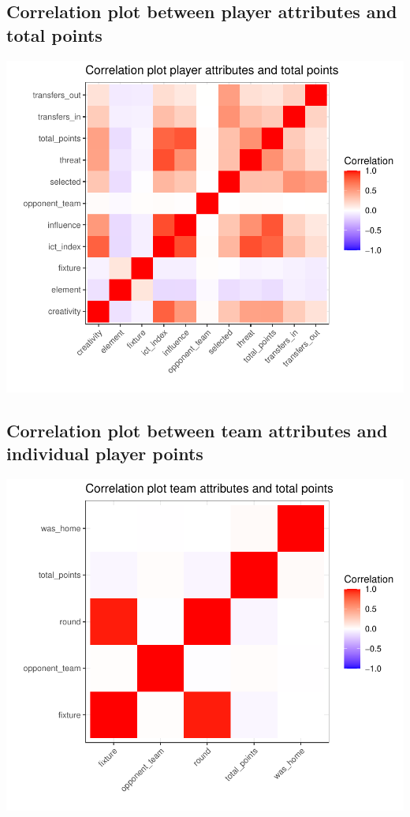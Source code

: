 \documentclass[11pt,preprint, authoryear]{elsarticle}
\numberwithin{equation}{section}
\numberwithin{figure}{section}
\numberwithin{table}{section}
\begin{document}
\hypertarget{correlation-plot-between-player-attributes-and-total-points}{%
\subsection{Correlation plot between player attributes and total
points}\label{correlation-plot-between-player-attributes-and-total-points}}

\includegraphics{Fantasy_premier_league_team_prediction_files/figure-latex/unnamed-chunk-2-1.pdf}

\hypertarget{correlation-plot-between-team-attributes-and-individual-player-points}{%
\subsection{Correlation plot between team attributes and individual
player
points}\label{correlation-plot-between-team-attributes-and-individual-player-points}}

\includegraphics{Fantasy_premier_league_team_prediction_files/figure-latex/unnamed-chunk-3-1.pdf}
\end{document}
